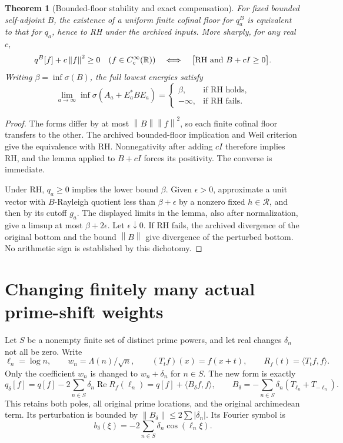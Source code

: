 \documentclass[11pt]{article}
\newtheorem{theorem}{Theorem}
\newcommand{\norm}[1]{\left\|#1\right\|}
\newcommand{\R}{\mathbb R}
\begin{document}
\begin{theorem}[Bounded-floor stability and exact compensation]
For fixed bounded self-adjoint $B$, the existence of a uniform finite
cofinal floor for $q_a^B$ is equivalent to that for $q_a$, hence to RH
under the archived inputs. More sharply, for any real $c$,
\[
 q^B[f]+c\norm f^2\ge0\quad(f\in C_c^\infty(\R))
 \quad\Longleftrightarrow\quad
 \bigl[\mathrm{RH}\ \hbox{and}\ B+cI\ge0\bigr].
\]
Writing $\beta=\inf\sigma(B)$, the full lowest energies satisfy
\[
 \lim_{a\to\infty}\inf\sigma(A_a+E_a^*BE_a)
 =\begin{cases}\beta,&\text{if RH holds},\\-\infty,&\text{if RH fails}.
 \end{cases}
\]
\end{theorem}
\begin{proof}
The forms differ by at most $\norm B\norm f^2$, so each finite
cofinal floor transfers to the other. The archived bounded-floor
implication and Weil criterion give the equivalence with RH.
Nonnegativity after adding $cI$ therefore implies RH, and the lemma
applied to $B+cI$ forces its positivity. The converse is immediate.

Under RH, $q_a\ge0$ implies the lower bound $\beta$. Given
$\epsilon>0$, approximate a unit vector with $B$-Rayleigh quotient
less than $\beta+\epsilon$ by a nonzero fixed $h\in\mathcal R$,
and then by its cutoff $g_a$. The displayed limits in the lemma,
also after normalization, give a limsup at most $\beta+2\epsilon$.
Let $\epsilon\downarrow0$. If RH fails, the archived divergence
of the original bottom and the bound $\norm B$ give divergence
of the perturbed bottom. No arithmetic sign is established by this dichotomy.
\end{proof}

\section{Changing finitely many actual prime-shift weights}
Let $S$ be a nonempty finite set of distinct prime powers, and let
real changes $\delta_n$ not all be zero. Write
\[
 \ell_n=\log n,\qquad w_n=\Lambda(n)/\sqrt n,\qquad
 (T_tf)(x)=f(x+t),\qquad R_f(t)=\langle T_tf,f\rangle.
\]
Only the coefficient $w_n$ is changed to $w_n+\delta_n$ for $n\in S$.
The new form is exactly
\[
 q_\delta[f]=q[f]-2\sum_{n\in S}\delta_n\operatorname{Re}R_f(\ell_n)
            =q[f]+\langle B_\delta f,f\rangle,
 \qquad B_\delta=-\sum_{n\in S}\delta_n(T_{\ell_n}+T_{-\ell_n}).
\]
This retains both poles, all original prime locations, and the original
archimedean term. Its perturbation is bounded by
$\norm{B_\delta}\le2\sum|\delta_n|$. Its Fourier symbol is
\[
 b_\delta(\xi)=-2\sum_{n\in S}\delta_n\cos(\ell_n\xi).
\]
\end{document}
